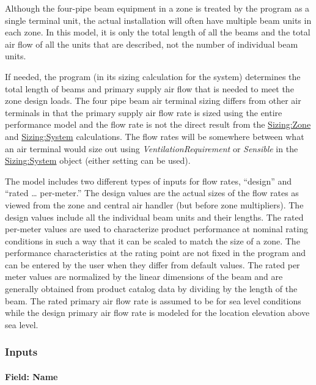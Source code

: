 Although the four-pipe beam equipment in a zone is treated by the program as a single terminal unit, the actual installation will often have multiple beam units in each zone. In this model, it is only the total length of all the beams and the total air flow of all the units that are described, not the number of individual beam units.

If needed, the program (in its sizing calculation for the system) determines the total length of beams and primary supply air flow that is needed to meet the zone design loads. The four pipe beam air terminal sizing differs from other air terminals in that the primary supply air flow rate is sized using the entire performance model and the flow rate is not the direct result from the \hyperref[sizingzone]{Sizing:Zone} and \hyperref[sizingsystem]{Sizing:System} calculations. The flow rates will be somewhere between what an air terminal would size out using \emph{VentilationRequirement} or \emph{Sensible} in the \hyperref[sizingsystem]{Sizing:System} object (either setting can be used).

The model includes two different types of inputs for flow rates, ``design'' and ``rated \ldots{} per-meter.'' The design values are the actual sizes of the flow rates as viewed from the zone and central air handler (but before zone multipliers). The design values include all the individual beam units and their lengths. The rated per-meter values are used to characterize product performance at nominal rating conditions in such a way that it can be scaled to match the size of a zone. The performance characteristics at the rating point are not fixed in the program and can be entered by the user when they differ from default values. The rated per meter values are normalized by the linear dimensions of the beam and are generally obtained from product catalog data by dividing by the length of the beam. The rated primary air flow rate is assumed to be for sea level conditions while the design primary air flow rate is modeled for the location elevation above sea level.

\subsubsection{Inputs}\label{inputs-10-000}

\paragraph{Field: Name}\label{field-name-10-000}

